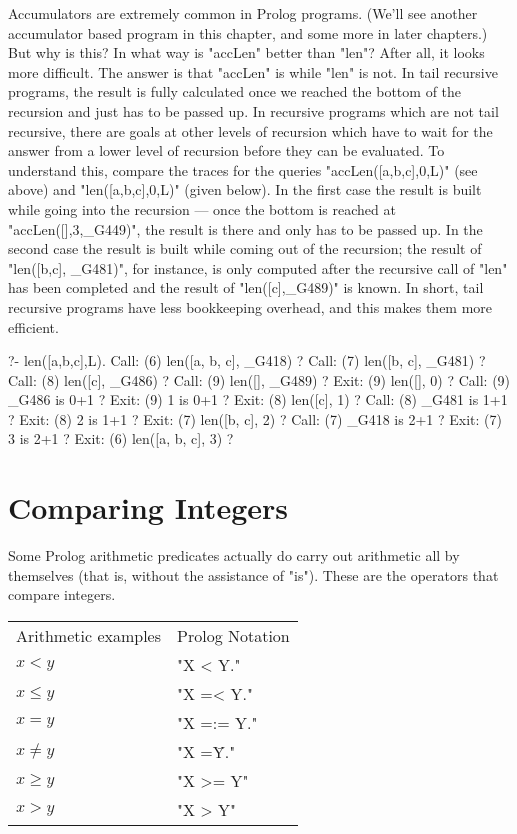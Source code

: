Accumulators are extremely common in Prolog programs.  (We'll see
another accumulator based program in this chapter, and some more in
later chapters.) But why is this? In what way is "accLen" better than
"len"? After all, it looks more difficult. The answer is that "accLen"
is  while "len" is not. In tail recursive
programs, the result is fully calculated once we reached the bottom of
the recursion and just has to be passed up. In recursive programs
which are not tail recursive, there are goals at other levels of
recursion which have to wait for the answer from a lower level of
recursion before they can be evaluated. To understand this, compare
the traces for the queries "accLen([a,b,c],0,L)" (see above) and
"len([a,b,c],0,L)" (given below). In the first case the result is
built while going into the recursion --- once the bottom is reached at
"accLen([],3,_G449)", the result is there and only has to be passed
up. In the second case the result is built while coming out of the
recursion; the result of "len([b,c], _G481)", for instance, is only
computed after the recursive call of "len" has been completed and the
result of "len([c],_G489)" is known. In short, tail recursive programs
have less bookkeeping overhead, and this makes them more efficient.

\begin{LPNcodedisplay}
?- len([a,b,c],L).
   Call: (6) len([a, b, c], _G418) ?
   Call: (7) len([b, c], _G481) ?
   Call: (8) len([c], _G486) ?
   Call: (9) len([], _G489) ?
   Exit: (9) len([], 0) ?
   Call: (9) _G486 is 0+1 ?
   Exit: (9) 1 is 0+1 ?
   Exit: (8) len([c], 1) ?
   Call: (8) _G481 is 1+1 ?
   Exit: (8) 2 is 1+1 ?
   Exit: (7) len([b, c], 2) ?
   Call: (7) _G418 is 2+1 ?
   Exit: (7) 3 is 2+1 ?
   Exit: (6) len([a, b, c], 3) ?
\end{LPNcodedisplay}


\section{Comparing Integers}\label{SEC.L5.COMPARING-INTEGERS}



Some Prolog arithmetic predicates actually do carry out arithmetic
all by themselves (that is, without the assistance of "is").
These are the operators that compare integers.

\begin{center}\begin{tabular}{ll}
Arithmetic examples & Prolog Notation\\
$x<y$&"X < Y."\\ \index{PROLOG </2@\texttt{</2}}
$x\le y$&"X =< Y."\\ \index{PROLOG =</2@\texttt{=</2}}
$x=y$&"X =:= Y."\\ \index{PROLOG =:=/2@\texttt{=:=/2}}
$x\not=y$&"X =\= Y."\\ \index{PROLOG =\=/2@\verb-=\=/2-}
$x\ge y$&"X >= Y"\\ \index{PROLOG >=/2@\texttt{>=/2}}
$x>y$&"X > Y" \index{PROLOG >/2@\texttt{>/2}}
\end{tabular}\end{center}


